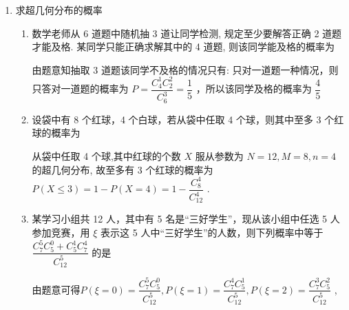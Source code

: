 \begin{enumerate}
\begin{enumerate}
        \item 一个袋中有 6 个同样大小的黑球，编号为 1, 2, 3, 4, 5, 6, 还有 4 个同样大小的白球, 编号为 7, 8, 9, 10.现从中任取 4 个球, 有如下几种变量:
        这四种变量中服从超几何分布的是
    \end{enumerate}
    \item 求超几何分布的概率
    \begin{enumerate}
        \item 数学老师从 6 道题中随机抽 3 道让同学检测, 规定至少要解答正确 2 道题才能及格. 某同学只能正确求解其中的 4 道题, 则该同学能及格的概率为
        \begin{jieda}
            由题意知抽取 3 道题该同学不及格的情况只有: 只对一道题一种情况，则只答对一道题的概率为 $P = \dfrac{C_{4}^{1}C_{2}^{2}}{C_{6}^{3}} = \dfrac{1}{5}$ ，所以该同学及格的概率为 $\dfrac{4}{5}$
        \end{jieda}
        \item 设袋中有 8 个红球，4 个白球，若从袋中任取 4 个球，则其中至多 3 个红球的概率为
        \begin{jieda}
            从袋中任取 4 个球,其中红球的个数 $X$ 服从参数为 $N = {12},M = 8,n = 4$ 的超几何分布, 故至多有 3 个红球的概率为 $P\left( {X \leq  3}\right)  = 1 - P\left( {X = 4}\right)  = 1 - \dfrac{C_{8}^{4}}{C_{12}^{4}}$ .
        \end{jieda}
        \item 某学习小组共 12 人，其中有 5 名是“三好学生”，现从该小组中任选 5 人参加竞赛，用 $\xi$ 表示这 5 人中“三好学生”的人数，则下列概率中等于 $\dfrac{{{C}}_{7}^{5}{{C}}_{5}^{0} + {{C}}_{5}^{1}{{C}}_{7}^{4}}{{{C}}_{12}^{5}}$ 的是
        \begin{jieda}
            由题意可得$P\left( {\xi  = 0}\right)  = \dfrac{C_{7}^5C_{5}^{0}}{C_{12}^5},P\left( {\xi  = 1}\right)  = \dfrac{C_{7}^{4}C_{5}^{1}}{C_{12}^5},P\left( {\xi  = 2}\right)  = \dfrac{C_{7}^{3}C_{5}^{2}}{C_{12}^5}$ ,
            

\end{jieda}
\end{enumerate}
\end{enumerate}
